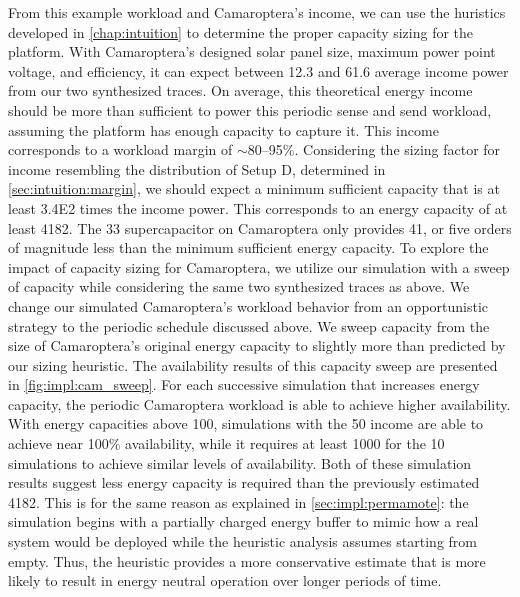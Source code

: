 From this example workload and Camaroptera's income, we can use the huristics developed in \cref{chap:intuition} to determine the proper capacity sizing for the platform.
With Camaroptera's designed solar panel size, maximum power point voltage, and efficiency, 
it can expect between 12.3 and 61.6\ssi{\milli\watt} average income power from our two synthesized traces.
On average, this theoretical energy income should be more than sufficient to power this periodic sense and send workload, assuming the platform has enough capacity to capture it.
This income corresponds to a workload margin of $\sim$80--95\%. 
Considering the sizing factor for income resembling the distribution of Setup D, determined in \cref{sec:intuition:margin}, we should expect a minimum sufficient capacity that is at least \num{3.4E2} times the income power. 
This corresponds to an energy capacity of at least 4182\ssi{\milli\Wh}. 
The 33\ssi{\milli\farad} supercapacitor on Camaroptera only provides 41\ssi{\micro\Wh}, or five orders of magnitude less than the minimum sufficient energy capacity.
To explore the impact of capacity sizing for Camaroptera, we utilize our simulation with a sweep of capacity while considering the same two synthesized traces as above. 
We change our simulated Camaroptera's workload behavior from an opportunistic strategy to the periodic schedule discussed above.
We sweep capacity from the size of Camaroptera's original energy capacity to slightly more than predicted by our sizing heuristic.
The availability results of this capacity sweep are presented in \cref{fig:impl:cam_sweep}.
For each successive simulation that increases energy capacity, the periodic Camaroptera workload is able to achieve higher availability.
With energy capacities above 100\ssi{\milli\watt\hour}, simulations with the 50\ssi[per-mode=symbol]{\milli\watt\per\centi\meter\squared} income are able to achieve near 100\% availability, while it requires at least 1000\ssi{\milli\watt\hour} for the 10\ssi[per-mode=symbol]{\milli\watt\per\centi\meter\squared} simulations to achieve similar levels of availability. 
Both of these simulation results suggest less energy capacity is required than the previously estimated 4182\ssi{\milli\Wh}.
This is for the same reason as explained in \cref{sec:impl:permamote}: the simulation begins with a partially charged energy buffer to mimic how a real system would be deployed while the heuristic analysis assumes starting from empty.
Thus, the heuristic provides a more conservative estimate that is more likely to result in energy neutral operation over longer periods of time.

